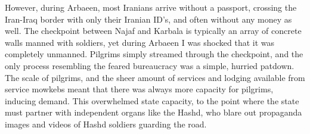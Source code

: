 However, during Arbaeen, most Iranians arrive without a passport, crossing the Iran-Iraq border with only their Iranian ID's, and often without any money as well. The checkpoint between Najaf and Karbala is typically an array of concrete walls manned with soldiers, yet during Arbaeen I was shocked that it was completely unmanned. Pilgrims simply streamed through the checkpoint, and the only process resembling the feared bureaucracy was a simple, hurried patdown. The scale of pilgrims, and the sheer amount of services and lodging available from service mowkebs meant that there was always more capacity for pilgrims, inducing demand. This overwhelmed state capacity, to the point where the state must partner with independent organs like the Hashd, who blare out propaganda images and videos of Hashd soldiers guarding the road. 




